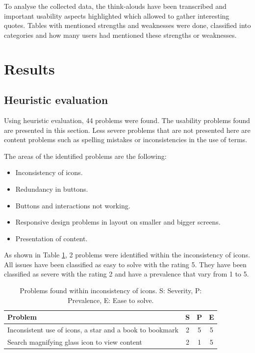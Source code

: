 \documentclass{sigchi}
\begin{document}
To analyse the collected data, the think-alouds have been transcribed and important usability aspects highlighted which allowed to gather interesting quotes. Tables with mentioned strengths and weaknesses were done, classified into categories and how many users had mentioned these strengths or weaknesses. 

\section{Results}
\raggedbottom

\subsection{Heuristic evaluation}
Using heuristic evaluation, 44 problems were found. The usability problems found are presented in this section. Less severe problems that are not presented here are content problems such as spelling mistakes or inconsistencies in the use of terms. 

The areas of the identified problems are the following:

\begin{itemize}[noitemsep]
    \item Inconsistency of icons.
    \item Redundancy in buttons.
    \item Buttons and interactions not working.
    \item Responsive design problems in layout on smaller and bigger screens.
    \item Presentation of content.
\end{itemize}

As shown in Table \ref{tab:icons}, 2 problems were identified within the inconsistency of icons. All issues have been classified as easy to solve with the rating 5. They have been classified as severe with the rating 2 and have a prevalence that vary from 1 to 5. 

\begin{table}[H]
    \centering
    \begin{tabular}{|m{6.5cm}|c|c|c|}
    \hline
        \textbf{Problem} & \textbf{S} & \textbf{P} & \textbf{E}\\
    \hline
         Inconsistent use of icons, a star and a book to bookmark  & 2 & 5 & 5\\
    \hline
         Search magnifying glass icon to view content & 2 & 1 & 5\\
    \hline
    \end{tabular}
    \caption{Problems found within inconsistency of icons. S: Severity, P: Prevalence, E: Ease to solve.}
    \label{tab:icons}
\end{table}
\end{document}
